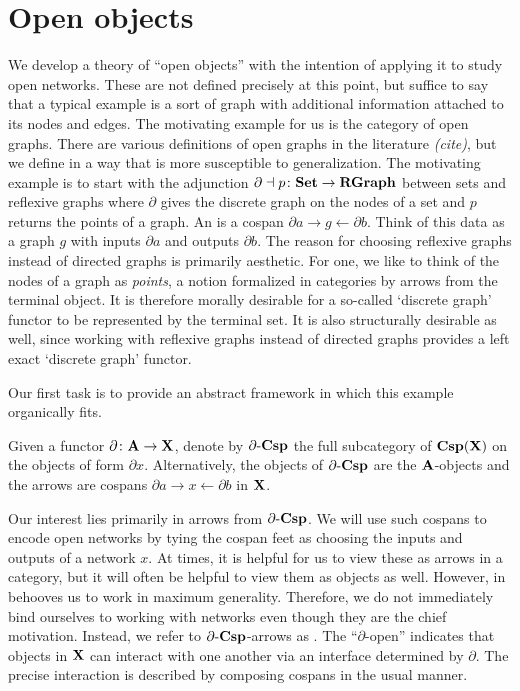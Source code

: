 \documentclass{amsart}
\begin{document}
\section{Open objects}
\label{sec:OpnObs}

We develop a theory of ``open objects'' with the intention of applying it to study open networks.  These are not defined precisely at this point, but suffice to say that a typical example is a sort of graph with additional information attached to its nodes and edges.  The motivating example for us is the category of open graphs.  There are various definitions of open graphs in the literature \emph{(cite)}, but we define in a way that is more susceptible to generalization.  The motivating example is to start with the adjunction $ \partial \dashv p \colon \mathbf{Set} \to \mathbf{RGraph} $ between sets and reflexive graphs where $ \partial $ gives the discrete graph on the nodes of a set and $ p $ returns the points of a graph.  An  is a cospan $ \partial a \to g \gets \partial b $.  Think of this data as a graph $ g $ with inputs $ \partial a $ and outputs $ \partial b $.  The reason for choosing reflexive graphs instead of directed graphs is primarily aesthetic.  For one, we like to think of the nodes of a graph as \emph{points}, a notion formalized in categories by arrows from the terminal object.  It is therefore morally desirable for a so-called `discrete graph' functor to be represented by the terminal set. It is also structurally desirable as well, since working with reflexive graphs instead of directed graphs provides a left exact `discrete graph' functor. 
 
Our first task is to provide an abstract framework in which this example organically fits.  

\begin{df} \label{df:(-)Csp}
	Given a functor $ \partial \colon \mathbf{A} \to \mathbf{X} $, denote by $  \partial  \text{-} \mathbf{Csp} $ the full subcategory of $ \mathbf{Csp}(\mathbf{X}) $ on the objects of form $ \partial x $. Alternatively, the objects of $  \partial  \text{-} \mathbf{Csp} $ are the $ \mathbf{A} $-objects and the arrows are cospans $ \partial a \to x \gets \partial b $ in $ \mathbf{X} $.  
\end{df}

Our interest lies primarily in arrows from $ \partial \text{-} \mathbf{Csp} $.  We will use such cospans to encode open networks by tying the cospan feet as choosing the inputs and outputs of a network $ x $. At times, it is helpful for us to view these as arrows in a category, but it will often be helpful to view them as objects as well.  However, in behooves us to work in maximum generality. Therefore, we do not immediately bind ourselves to working with networks even though they are the chief motivation.  Instead, we refer to $ \partial \text{-} \mathbf{Csp} $-arrows as .  The ``$ \partial $-open'' indicates that objects in $ \mathbf{X} $ can interact with one another via an interface determined by $ \partial $.  The precise interaction is described by composing cospans in the usual manner.
\end{document}
